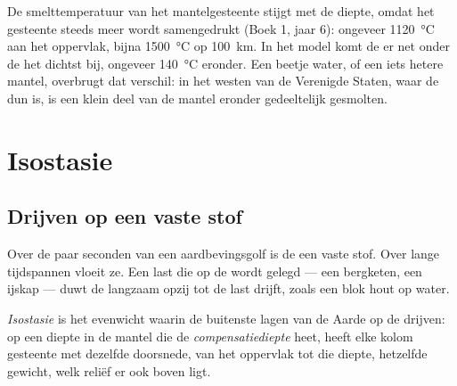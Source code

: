 De smelttemperatuur van het mantelgesteente stijgt met de diepte, omdat het
gesteente steeds meer wordt samengedrukt (Boek 1, jaar 6): ongeveer
\qty{1120}{\celsius} aan het oppervlak, bijna \qty{1500}{\celsius} op
\qty{100}{km}. In het model komt de  er net onder de  het
dichtst bij, ongeveer \qty{140}{\celsius} eronder. Een beetje water, of een iets
hetere mantel, overbrugt dat verschil: in het westen van de Verenigde Staten, waar
de  dun is, is een klein deel van de mantel eronder gedeeltelijk gesmolten.

\section{Isostasie}

\subsection{Drijven op een vaste stof}

Over de paar seconden van een aardbevingsgolf is de  een vaste stof.
Over lange tijdspannen vloeit ze. Een last die op de  wordt gelegd ---
een bergketen, een ijskap --- duwt de  langzaam opzij tot de last
drijft, zoals een blok hout op water.

\begin{definition}\label{def:g11:lithosphere-asthenosphere:isostasy}
\emph{Isostasie} is het evenwicht waarin de buitenste lagen van de
Aarde op de  drijven: op een diepte in de mantel die de
\emph{compensatiediepte} heet, heeft elke kolom gesteente
met dezelfde doorsnede, van het oppervlak tot die diepte, hetzelfde gewicht,
welk reliëf er ook boven ligt.
\end{definition}


